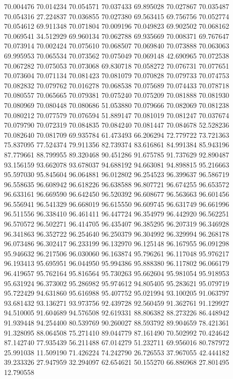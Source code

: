 70.004476
70.014234
70.054571
70.037433
69.895028
70.027867
70.035487
70.054316
27.224837
70.036855
70.027380
69.563415
69.756756
70.052774
70.054612
69.911348
70.071804
70.009196
70.049823
69.902502
70.068162
70.069541
34.512929
69.960134
70.062788
69.935669
70.008371
69.767647
70.073914
70.002424
70.075610
70.068507
70.069840
70.073888
70.063063
69.995953
70.065534
70.073562
70.075049
70.069148
42.690965
70.072538
70.067282
70.075053
70.073068
69.830718
70.058272
70.076731
70.077651
70.073604
70.071134
70.081423
70.081079
70.070828
70.079733
70.074753
70.082832
70.079762
70.016278
70.068538
70.075689
70.074433
70.078718
70.080557
70.065665
70.079381
70.075240
70.075209
70.081888
70.081930
70.080969
70.080448
70.080686
51.053880
70.079666
70.082069
70.081238
70.080212
70.077579
70.076594
51.889147
70.081019
70.081247
70.037674
70.079790
70.072319
70.084835
70.084240
70.081447
70.084678
52.528236
70.082640
70.081709
69.935784
61.473493
66.206294
72.779722
73.721363
75.837095
77.524374
79.911356
82.739374
83.616861
84.991384
85.943196
87.779661
88.799955
89.320468
90.451286
91.675785
91.737629
92.890487
93.156159
93.662078
93.678037
94.688192
94.663081
94.898815
95.216663
95.597030
95.845604
96.064881
96.012802
96.254523
96.399637
96.586719
96.558635
96.608942
96.618226
96.638588
96.807721
96.674255
96.653572
96.633161
96.669590
96.642450
96.520392
96.608677
96.563663
96.601456
96.556941
96.541329
96.668019
96.615550
96.609745
96.631749
96.661996
96.511556
96.338410
96.461411
96.447724
96.354979
96.442920
96.562251
96.570572
96.502271
96.414705
96.435407
96.385295
96.207319
96.346928
96.341863
96.352722
96.254640
96.250379
96.304992
96.329994
96.268178
96.073486
96.302417
96.233199
96.132970
96.125148
96.167955
96.091298
95.946632
96.217506
96.030060
96.163874
95.796261
96.117048
95.976217
96.193413
95.695951
96.044950
95.994386
95.888380
96.117802
96.066179
96.419657
95.762164
95.816564
95.730263
95.662604
95.981054
95.918953
95.631924
96.373002
95.286982
95.974612
94.805405
95.283621
95.079719
95.722429
94.631860
95.616988
95.407752
95.021994
93.100205
91.063797
93.681432
93.136271
93.973756
92.439728
92.560459
91.362761
91.129927
94.510005
91.604689
94.576508
92.619331
88.806382
88.273226
86.448942
91.939448
94.254400
80.539769
90.260027
88.593792
89.904659
78.421361
91.328095
88.064508
75.271410
89.044779
87.161490
70.502992
70.424642
87.142740
77.935439
56.211488
67.014279
51.232711
69.956016
80.787972
25.991038
11.509190
71.426224
74.242790
26.726553
37.967055
42.444182
39.233326
27.947959
32.294097
62.654621
50.155270
66.886968
27.801495
12.790558
